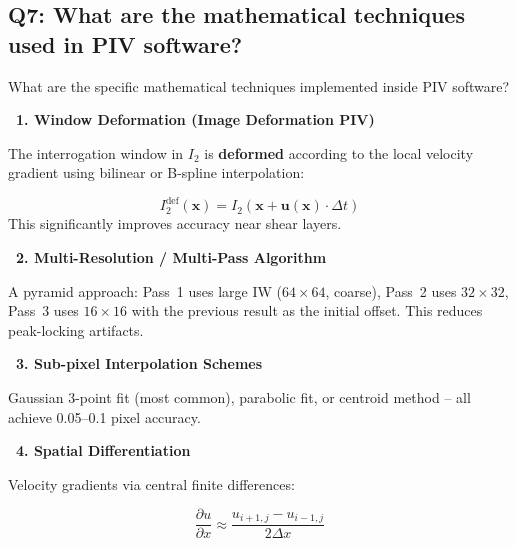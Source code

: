 \documentclass[12pt,a4paper]{article}
\begin{document}
\subsection{Q7: What are the mathematical techniques used in PIV software?}

\begin{questionbox}
What are the specific mathematical techniques implemented inside PIV software?
\end{questionbox}

\begin{answerbox}

\textbf{\color{accentpurple}~1. Window Deformation (Image Deformation PIV)}

The interrogation window in $I_2$ is \textbf{deformed} according to the local velocity gradient using bilinear or B-spline interpolation:
\begin{mathbox}
\begin{equation}
    I_2^{\text{def}}(\mathbf{x}) = I_2\!\left(\mathbf{x} + \mathbf{u}(\mathbf{x})\cdot\Delta t\right)
\end{equation}
This significantly improves accuracy near shear layers.
\end{mathbox}

\vspace{0.5em}
\textbf{\color{accentpurple}~2. Multi-Resolution / Multi-Pass Algorithm}

A pyramid approach: Pass~1 uses large IW ($64\times64$, coarse), Pass~2 uses $32\times32$, Pass~3 uses $16\times16$ with the previous result as the initial offset. This reduces peak-locking artifacts.

\vspace{0.5em}
\textbf{\color{accentpurple}~3. Sub-pixel Interpolation Schemes}

Gaussian 3-point fit (most common), parabolic fit, or centroid method -- all achieve 0.05--0.1 pixel accuracy.

\vspace{0.5em}
\textbf{\color{accentpurple}~4. Spatial Differentiation}

Velocity gradients via central finite differences:
\begin{mathbox}
\begin{equation}
    \frac{\partial u}{\partial x} \approx \frac{u_{i+1,j} - u_{i-1,j}}{2\Delta x}
\end{equation}
\end{mathbox}


\end{answerbox}
\end{document}
